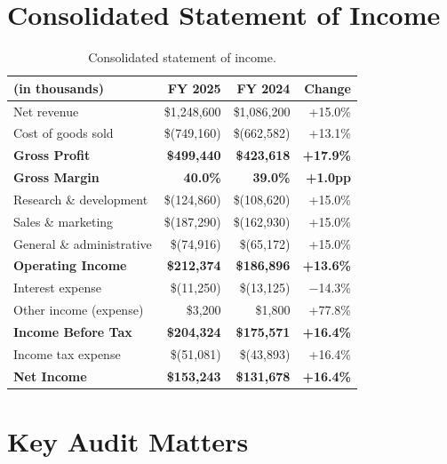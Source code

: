 \documentclass[
    language=english,
    doctype=audit-report,
    institution=none,
]{../../omnilatex}
\begin{document}
\section{Consolidated Statement of Income}

\begin{table}[h]
    \centering
    \begin{tabular}{lrrr}
        \toprule
        \textbf{(in thousands)} & \textbf{FY 2025} & \textbf{FY 2024} & \textbf{Change} \\
        \midrule
        \quad Net revenue & \$1,248,600 & \$1,086,200 & +15.0\% \\
        \quad Cost of goods sold & \$(749,160) & \$(662,582) & +13.1\% \\
        \midrule
        \textbf{Gross Profit} & \textbf{\$499,440} & \textbf{\$423,618} & \textbf{+17.9\%} \\
        \textbf{Gross Margin} & \textbf{40.0\%} & \textbf{39.0\%} & \textbf{+1.0pp} \\
        \midrule
        \quad Research \& development & \$(124,860) & \$(108,620) & +15.0\% \\
        \quad Sales \& marketing & \$(187,290) & \$(162,930) & +15.0\% \\
        \quad General \& administrative & \$(74,916) & \$(65,172) & +15.0\% \\
        \midrule
        \textbf{Operating Income} & \textbf{\$212,374} & \textbf{\$186,896} & \textbf{+13.6\%} \\
        \midrule
        \quad Interest expense & \$(11,250) & \$(13,125) & $-$14.3\% \\
        \quad Other income (expense) & \$3,200 & \$1,800 & +77.8\% \\
        \midrule
        \textbf{Income Before Tax} & \textbf{\$204,324} & \textbf{\$175,571} & \textbf{+16.4\%} \\
        \quad Income tax expense & \$(51,081) & \$(43,893) & +16.4\% \\
        \midrule
        \textbf{Net Income} & \textbf{\$153,243} & \textbf{\$131,678} & \textbf{+16.4\%} \\
        \bottomrule
    \end{tabular}
    \caption{Consolidated statement of income.}
\end{table}

\section{Key Audit Matters}
\end{document}
